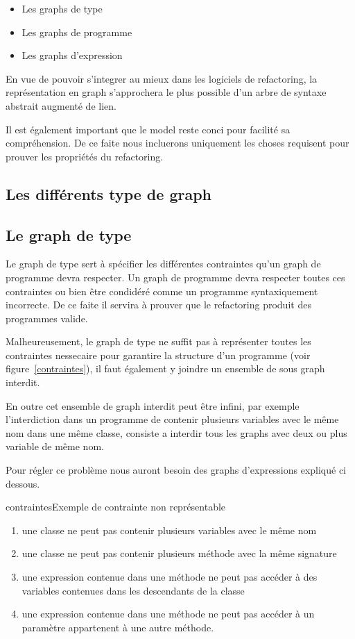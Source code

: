 \documentclass[a4paper, 12pt]{article}
\begin{document}
\begin{itemize}[label=\textbullet]
\item Les graphs de type
\item Les graphs de programme
\item Les graphs d'expression
\end{itemize}

En vue de pouvoir s'integrer au mieux dans les logiciels de refactoring, la représentation en graph s'approchera le plus possible d'un arbre de syntaxe abstrait augmenté de lien.

Il est également important que le model reste conci pour facilité sa compréhension. De ce faite nous incluerons uniquement les choses requisent pour prouver les propriétés du refactoring.

\subsection{Les différents type de graph}

\subsection{Le graph de type}

Le graph de type sert à spécifier les différentes contraintes qu'un graph de programme devra respecter. Un graph de programme devra respecter toutes ces contraintes ou bien être condidéré comme un programme syntaxiquement incorrecte. De ce faite il servira à prouver que le refactoring produit des programmes valide.

Malheureusement, le graph de type ne suffit pas à représenter toutes les contraintes nessecaire pour garantire la structure d'un programme (voir figure~\ref{contraintes}), il faut également y joindre un ensemble de sous graph interdit.

En outre cet ensemble de graph interdit peut être infini, par exemple l'interdiction dans un programme de contenir plusieurs variables avec le même nom dans une même classe, consiste a interdir tous les graphs avec deux ou plus variable de même nom.

Pour régler ce problème nous auront besoin des graphs d'expressions expliqué ci dessous.\label{subsec:graphExpression}


\begin{myfig}{contraintes}{Exemple de contrainte non représentable}
\begin{enumerate}
 \scriptsize \item une classe ne peut pas contenir plusieurs variables avec le même nom
 \scriptsize \item une classe ne peut pas contenir plusieurs méthode avec la même signature
 \scriptsize \item une expression contenue dans une méthode ne peut pas accéder à des variables contenues dans les descendants de la classe
 \scriptsize \item une expression contenue dans une méthode ne peut pas accéder à un paramètre appartenent à une autre méthode.
\end{enumerate}
\end{myfig}
\end{document}
